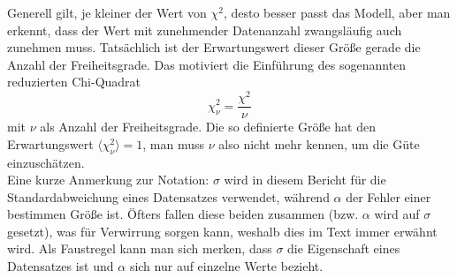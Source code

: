 Generell gilt, je kleiner der Wert von \( \chi^2 \), desto besser passt das Modell, aber man erkennt, dass der Wert mit zunehmender Datenanzahl zwangsläufig auch zunehmen muss. Tatsächlich ist der Erwartungswert dieser Größe gerade die Anzahl der Freiheitsgrade. Das motiviert die Einführung des sogenannten reduzierten Chi-Quadrat 
\begin{equation}\label{eqn:chinu}
	\chi_{\nu}^2 = \frac{\chi^2}{\nu}
\end{equation}
mit \( \nu \) als Anzahl der Freiheitsgrade.\cite[S. 107]{error} Die so definierte Größe hat den Erwartungswert \( \langle \chi_{\nu}^2 \rangle = 1 \), man muss \( \nu \) also nicht mehr kennen, um die Güte einzuschätzen. \\

Eine kurze Anmerkung zur Notation: \( \sigma \) wird in diesem Bericht für die Standardabweichung eines Datensatzes verwendet, während \( \alpha \) der Fehler einer bestimmen Größe ist. Öfters fallen diese beiden zusammen (bzw. \( \alpha \) wird auf \( \sigma \) gesetzt), was für Verwirrung sorgen kann, weshalb dies im Text immer erwähnt wird.
Als Faustregel kann man sich merken, dass \( \sigma \) die Eigenschaft eines Datensatzes ist und \( \alpha \) sich nur auf einzelne Werte bezieht.
